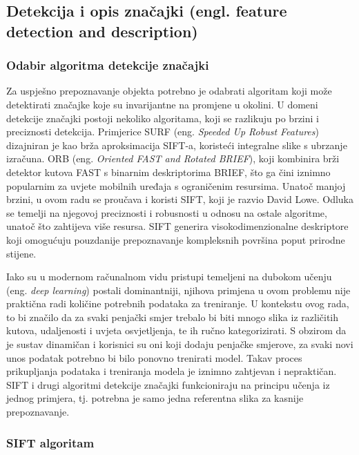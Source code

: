 \subsection{Detekcija i opis značajki (engl. feature detection and description)}

\subsubsection{Odabir algoritma detekcije značajki}

Za uspješno prepoznavanje objekta potrebno je odabrati algoritam koji može detektirati značajke koje su invarijantne na promjene u okolini. U domeni detekcije značajki postoji nekoliko algoritama, koji se razlikuju po brzini i preciznosti detekcija. Primjerice SURF (eng. \textit{Speeded Up Robust Features}) dizajniran je kao brža aproksimacija SIFT-a, koristeći integralne slike s ubrzanje izračuna. ORB (eng. \textit{Oriented FAST and Rotated BRIEF}), koji kombinira brži detektor kutova FAST s binarnim deskriptorima BRIEF, što ga čini iznimno popularnim za uvjete mobilnih uređaja s ograničenim resursima. Unatoč manjoj brzini, u ovom radu se proučava i koristi SIFT, koji je razvio David Lowe. Odluka se temelji na njegovoj preciznosti i robusnosti u odnosu na ostale algoritme, unatoč što zahtijeva više resursa. SIFT generira visokodimenzionalne deskriptore koji omogućuju pouzdanije prepoznavanje kompleksnih površina poput prirodne stijene. 

Iako su u modernom računalnom vidu pristupi temeljeni na dubokom učenju (eng. \textit{deep learning}) postali dominantniji, njihova primjena u ovom problemu nije praktična radi količine potrebnih podataka za treniranje. U kontekstu ovog rada, to bi značilo da za svaki penjački smjer trebalo bi biti mnogo slika iz različitih kutova, udaljenosti i uvjeta osvjetljenja, te ih ručno kategorizirati. S obzirom da je sustav dinamičan i korisnici su oni koji dodaju penjačke smjerove, za svaki novi unos podatak potrebno bi bilo ponovno trenirati model. Takav proces prikupljanja podataka i treniranja modela je iznimno zahtjevan i nepraktičan. SIFT i drugi algoritmi detekcije značajki funkcioniraju na principu učenja iz jednog primjera, tj. potrebna je samo jedna referentna slika za kasnije prepoznavanje. 

\subsubsection{SIFT algoritam}


